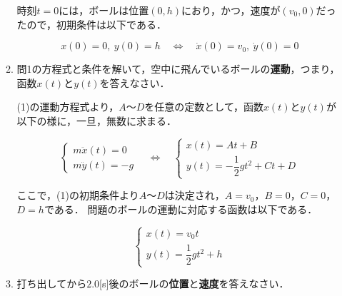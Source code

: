 \documentclass[a4paper,11pt]{ltjsarticle}
\begin{document}
\begin{enumerate}
\begin{enumerate}[label=(\arabic*)]
        時刻$t=0$には，ボールは位置$(0,h)$におり，かつ，速度が$(v_0,0)$だったので，初期条件は以下である．

        \begin{equation*}
            x(0)=0,\ y(0)=h  \quad \Leftrightarrow \quad
            \dot{x}(0)=v_0,\ \dot{y}(0)=0
        \end{equation*}

        \vspace{5pt}

        \item 問1の方程式と条件を解いて，空中に飛んでいるボールの\textbf{運動}，つまり，函数$x(t)$と$y(t)$を答えなさい．
        
        \vspace{5pt}

        (1)の運動方程式より，$A$～$D$を任意の定数として，函数$x(t)$と$y(t)$が以下の様に，一旦，無数に求まる．

        \begin{equation*}
            \begin{cases}
                m \ddot{x}(t)=0 \\
                m \ddot{y}(t)=-g
            \end{cases}
            \quad \Leftrightarrow \quad
            \begin{cases}
                x(t)=At+B \\
                y(t)=-\dfrac{1}{2}gt^2+Ct+D
            \end{cases}
        \end{equation*}

        \clearpage

        ここで，(1)の初期条件より$A$～$D$は決定され，$A=v_0$，$B=0$，$C=0$，$D=h$である．
        問題のボールの運動に対応する函数は以下である．

        \begin{equation*}
            \begin{cases}
                x(t)=v_0t \\
                y(t)= \dfrac{1}{2}gt^2+h
            \end{cases}
        \end{equation*}

        \vspace{5pt}

        \item 打ち出してから$2.0$[s]後のボールの\textbf{位置}と\textbf{速度}を答えなさい．


\end{enumerate}
\end{enumerate}
\end{document}
